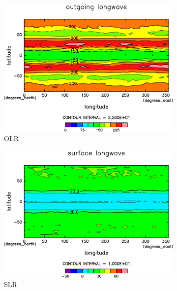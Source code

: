 \documentclass[body]{subfiles}
\begin{document}
\begin{figure}[t]
	\centering
	\begin{subfigure}{.4\textwidth}
		\centering
		\includegraphics[width=\columnwidth]{S1600/OLR,time=3650:4015-crop-rotate.pdf}
		\caption{OLR \hmu*{[W/m^{-2}]}}\label{S1600OLR}
	\end{subfigure}
	\begin{subfigure}{.4\textwidth}
		\centering
		\includegraphics[width=\columnwidth]{S1600/SLR,time=3650:4015-crop-rotate.pdf}
		\caption{SLR\hmu*{[W/m^{-2}]}}\label{S1600SLR}
	\end{subfigure}
	\begin{subfigure}{.4\textwidth}
		\centering

\end{subfigure}
\end{figure}
\end{document}
